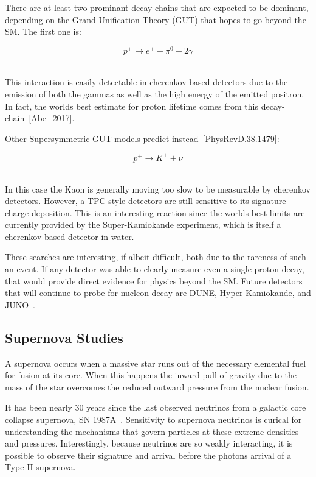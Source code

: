 There are at least two prominant decay chains that are expected to be dominant, depending on the Grand-Unification-Theory (GUT) that hopes to go beyond the SM.
The first one is:

\begin{equation}
  p^{+} \rightarrow e^{+} + \pi^{0} + 2 \gamma
\end{equation}
~\label{eq:rxn_proton_decay1}

This interaction is easily detectable in cherenkov based detectors due to the emission of both the gammas as well as the high energy of the emitted positron.
In fact, the worlds best estimate for proton lifetime comes from this decay-chain~\ref{Abe_2017}.

Other Supersymmetric GUT models predict instead~\ref{PhysRevD.38.1479}:

\begin{equation}
  p^{+} \rightarrow K^{+} + \nu
\end{equation}
~\label{eq:rxn_proton_decay2}

In this case the Kaon is generally moving too slow to be measurable by cherenkov detectors.
However, a TPC style detectors are still sensitive to its signature charge deposition.
This is an interesting reaction since the worlds best limits are currently provided by the Super-Kamiokande experiment, which is itself a cherenkov based detector in water.

These searches are interesting, if albeit difficult, both due to the rareness of such an event.
If any detector was able to clearly measure even a single proton decay, that would provide direct evidence for physics beyond the SM.
Future detectors that will continue to probe for nucleon decay are DUNE, Hyper-Kamiokande, and JUNO~\citep{DUNE_TDR_V1_Abi_2020, https://doi.org/10.48550/arxiv.1805.04163, Juno:2022103927}.

\subsection{Supernova Studies}
\label{sect:intro_supernova}

A supernova occurs when a massive star runs out of the necessary elemental fuel for fusion at its core.
When this happens the inward pull of gravity due to the mass of the star overcomes the reduced outward pressure from the nuclear fusion.

It has been nearly 30 years since the last observed neutrinos from a galactic core collapse supernova, SN 1987A~\citep{1987ApJ...322..795F}.
Sensitivity to supernova neutrinos is curical for understanding the mechanisms that govern particles at these extreme densities and pressures.
Interestingly, because neutrinos are so weakly interacting, it is possible to observe their signature and arrival before the photons arrival of a Type-II supernova.

